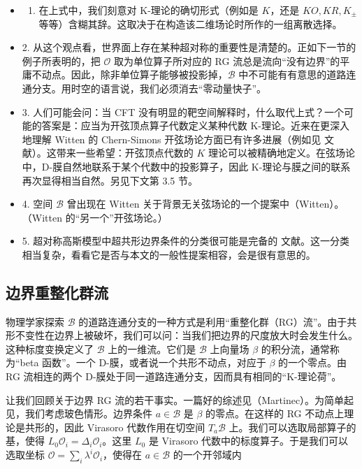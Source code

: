 \documentclass[11pt,a4paper]{ctexart}
\begin{document}
\begin{itemize}
\item
  \begin{enumerate}
  \def\labelenumi{\arabic{enumi}.}
  \tightlist
  \item
    在上式中，我们刻意对 K-理论的确切形式（例如是 \(K\)，还是 \(KO,KR,K_\pm\) 等等）含糊其辞。这取决于在构造该二维场论时所作的一组离散选择。
  \end{enumerate}
\item
  2. 从这个观点看，世界面上存在某种超对称的重要性是清楚的。正如下一节的例子所表明的，把 \({\mathcal O}\) 取为单位算子所对应的 RG 流总是流向``没有边界''的平庸不动点。因此，除非单位算子能够被投影掉，\({\mathcal B}\) 中不可能有有意思的道路连通分支。用时空的语言说，我们必须消去``零动量快子''。
\item
  3. 人们可能会问：当 CFT 没有明显的靶空间解释时，什么取代上式？一个可能的答案是：应当为开弦顶点算子代数定义某种代数 K-理论。近来在更深入地理解 Witten 的 Chern-Simons 开弦场论方面已有许多进展（例如见 文献）。这带来一些希望：开弦顶点代数的 \(K\) 理论可以被精确地定义。在弦场论中，D-膜自然地联系于某个代数中的投影算子，因此 K-理论与膜之间的联系再次显得相当自然。另见下文第 3.5 节。
\item
  4. 空间 \({\mathcal B}\) 曾出现在 Witten 关于背景无关弦场论的一个提案中（Witten）。（Witten 的``另一个''开弦场论。）
\item
  5. 超对称高斯模型中超共形边界条件的分类很可能是完备的 文献。这一分类相当复杂，看看它是否与本文的一般性提案相容，会是很有意思的。
\end{itemize}

\subsection{边界重整化群流}\label{ux8fb9ux754cux91cdux6574ux5316ux7fa4ux6d41}

物理学家探索 \({\mathcal B}\) 的道路连通分支的一种方式是利用``重整化群（RG）流''。由于共形不变性在边界上被破坏，我们可以问：当我们把边界的尺度放大时会发生什么。这种标度变换定义了 \({\mathcal B}\) 上的一维流。它们是 \({\mathcal B}\) 上向量场 \(\beta\) 的积分流，通常称为``beta 函数''。一个 D-膜，或者说一个共形不动点，对应于 \(\beta\) 的一个零点。由 RG 流相连的两个 D-膜处于同一道路连通分支，因而具有相同的``K-理论荷''。

让我们回顾关于边界 RG 流的若干事实。一篇好的综述见（Martinec）。为简单起见，我们考虑玻色情形。边界条件 \(a\in {\mathcal B}\) 是 \(\beta\) 的零点。在这样的 RG 不动点上理论是共形的，因此 Virasoro 代数作用在切空间 \(T_{a}{\mathcal B}\) 上。我们可以选取局部算子的基，使得 \(L_0 {\mathcal O}_i = \Delta_i {\mathcal O}_i\)。这里 \(L_0\) 是 Virasoro 代数中的标度算子。于是我们可以选取坐标 \({\mathcal O} = \sum_i \lambda^i {\mathcal O}_i\)，使得在 \(a\in {\mathcal B}\) 的一个开邻域内
\end{document}
